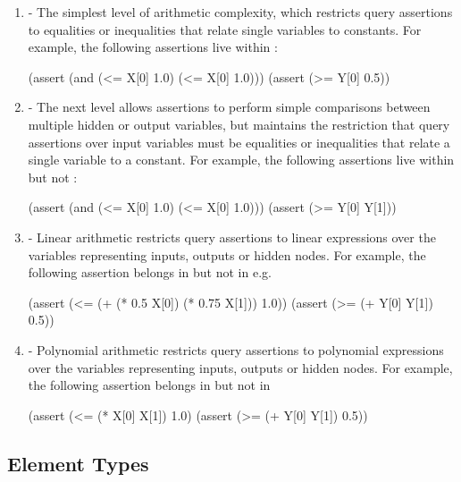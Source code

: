 \begin{enumerate}
\item \textbf{\bnd{}} - 
The simplest level of arithmetic complexity, which restricts query assertions to equalities or inequalities that relate single variables to constants. For example, the following assertions live within \bnd{}:

\begin{code}[style=lbnf]
(assert (and (<= X[0] 1.0) (<= X[0] 1.0)))
(assert (>= Y[0] 0.5))
\end{code}

\item \textbf{\cout{}} - 
The next level allows assertions to perform simple comparisons between multiple hidden or output variables, but maintains the restriction that query assertions over input variables must be equalities or inequalities that relate a single variable to a constant. For example, the following assertions live within \cout{} but not \bnd{}:

\begin{code}[style=lbnf]
(assert (and (<= X[0] 1.0) (<= X[0] 1.0)))
(assert (>= Y[0] Y[1]))
\end{code}

\item \textbf{\lin{}} - Linear arithmetic restricts query assertions to linear expressions over the variables representing inputs, outputs or hidden nodes. For example, the following assertion belongs in \lin{} but not in \cout{} e.g. 

\begin{code}[style=lbnf]
(assert (<= (+ (* 0.5 X[0]) (* 0.75 X[1])) 1.0))
(assert (>= (+ Y[0] Y[1]) 0.5))
\end{code}

\item \textbf{\poly{}} - Polynomial arithmetic restricts query assertions to polynomial expressions over the variables representing inputs, outputs or hidden nodes. 
For example, the following assertion belongs in \poly{} but not in \lin{}

\begin{code}[style=lbnf]
(assert (<= (* X[0] X[1]) 1.0)
(assert (>= (+ Y[0] Y[1]) 0.5))
\end{code}

\end{enumerate}


\subsection{Element Types}
\label{sec:element-types}

